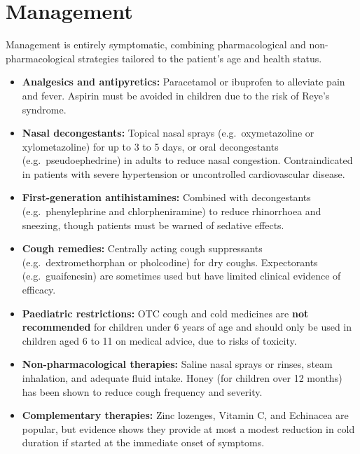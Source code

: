 \section*{Management}
Management is entirely symptomatic, combining pharmacological and non-pharmacological strategies tailored to the patient's age and health status.
\begin{itemize}
    \item \textbf{Analgesics and antipyretics:} Paracetamol or ibuprofen to alleviate pain and fever. Aspirin must be avoided in children due to the risk of Reye's syndrome.
    \item \textbf{Nasal decongestants:} Topical nasal sprays (e.g.\ oxymetazoline or xylometazoline) for up to 3 to 5 days, or oral decongestants (e.g.\ pseudoephedrine) in adults to reduce nasal congestion. Contraindicated in patients with severe hypertension or uncontrolled cardiovascular disease.
    \item \textbf{First-generation antihistamines:} Combined with decongestants (e.g.\ phenylephrine and chlorpheniramine) to reduce rhinorrhoea and sneezing, though patients must be warned of sedative effects.
    \item \textbf{Cough remedies:} Centrally acting cough suppressants (e.g.\ dextromethorphan or pholcodine) for dry coughs. Expectorants (e.g.\ guaifenesin) are sometimes used but have limited clinical evidence of efficacy.
    \item \textbf{Paediatric restrictions:} OTC cough and cold medicines are \textbf{not recommended} for children under 6 years of age and should only be used in children aged 6 to 11 on medical advice, due to risks of toxicity.
    \item \textbf{Non-pharmacological therapies:} Saline nasal sprays or rinses, steam inhalation, and adequate fluid intake. Honey (for children over 12 months) has been shown to reduce cough frequency and severity.
    \item \textbf{Complementary therapies:} Zinc lozenges, Vitamin C, and Echinacea are popular, but evidence shows they provide at most a modest reduction in cold duration if started at the immediate onset of symptoms.
\end{itemize}

